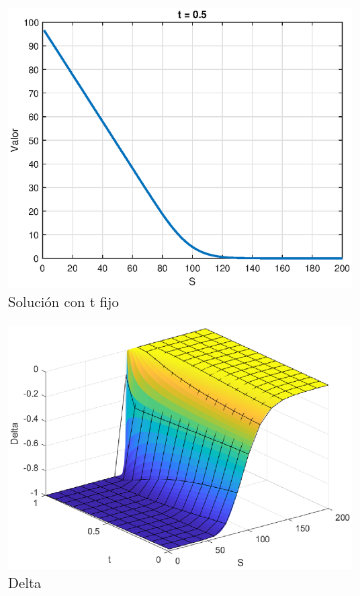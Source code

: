 \begin{figure}[H]
\begin{subfigure}[b]{0.35\linewidth}
    \end{subfigure}
    \begin{subfigure}[b]{0.35\linewidth}
        \includegraphics[width=\linewidth]{Imagenes/6_Sols/Put/PuttFIjo.eps}
        \caption{Solución con t fijo}
    \end{subfigure}
    \begin{subfigure}[b]{0.35\linewidth}
        \includegraphics[width=\linewidth]{Imagenes/6_Sols/Put/Put_Delta.eps}
        \caption{Delta}
    \end{subfigure}
    \begin{subfigure}[b]{0.35\linewidth}

\end{subfigure}
\end{figure}
